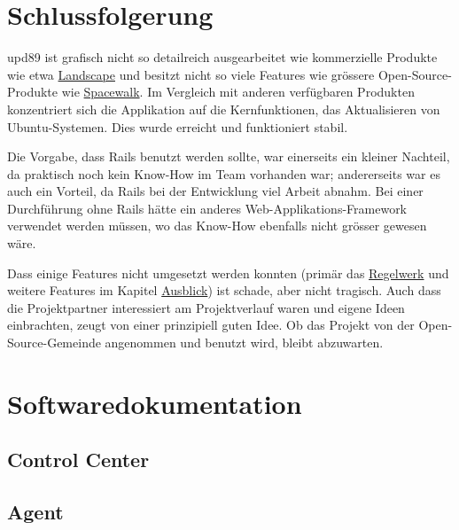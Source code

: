 \section{Schlussfolgerung}
\label{conclusion}

\gls{upd89} ist grafisch nicht so detailreich ausgearbeitet wie kommerzielle Produkte wie etwa \hyperref[sec:analysis:competition:landscape]{Landscape} und besitzt nicht so viele Features wie grössere Open-Source-Produkte wie \hyperref[sec:analysis:competition:spacewalk]{Spacewalk}. Im Vergleich mit anderen verfügbaren Produkten konzentriert sich die Applikation auf die Kernfunktionen, das Aktualisieren von Ubuntu-Systemen. Dies wurde erreicht und funktioniert stabil.

Die Vorgabe, dass Rails benutzt werden sollte, war einerseits ein kleiner Nachteil, da praktisch noch kein Know-How im Team vorhanden war; andererseits war es auch ein Vorteil, da Rails bei der Entwicklung viel Arbeit abnahm. Bei einer Durchführung ohne Rails hätte ein anderes Web-Applikations-Framework verwendet werden müssen, wo das Know-How ebenfalls nicht grösser gewesen wäre.

Dass einige Features nicht umgesetzt werden konnten (primär das \hyperref[sec:ausblick:regelwerk]{Regelwerk} und weitere Features im Kapitel \hyperref[sec:ausblick]{Ausblick}) ist schade, aber nicht tragisch. Auch dass die Projektpartner interessiert am Projektverlauf waren und eigene Ideen einbrachten, zeugt von einer prinzipiell guten Idee. Ob das Projekt von der Open-Source-Gemeinde angenommen und benutzt wird, bleibt abzuwarten.

\xxx

\section{Softwaredokumentation}
\label{documentation}



\subsection*{Control Center}



\subsection*{Agent}
